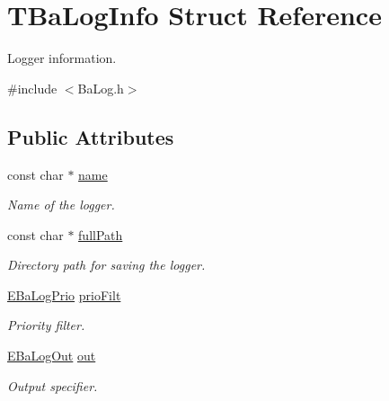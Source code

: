 \hypertarget{structTBaLogInfo}{}\section{T\+Ba\+Log\+Info Struct Reference}
\label{structTBaLogInfo}


Logger information.  




{\ttfamily \#include $<$Ba\+Log.\+h$>$}

\subsection*{Public Attributes}
\begin{DoxyCompactItemize}
\item 
\mbox{\label{structTBaLogInfo_a6fe0471fbe5aee2253366cd72f3fcfd2}} 
const char $\ast$ \hyperlink{structTBaLogInfo_a6fe0471fbe5aee2253366cd72f3fcfd2}{name}
\begin{DoxyCompactList}\small\item\em Name of the logger. \end{DoxyCompactList}\item 
\mbox{\label{structTBaLogInfo_aad77a8e412b731cb1f746fc2eec116a3}} 
const char $\ast$ \hyperlink{structTBaLogInfo_aad77a8e412b731cb1f746fc2eec116a3}{full\+Path}
\begin{DoxyCompactList}\small\item\em Directory path for saving the logger. \end{DoxyCompactList}\item 
\mbox{\label{structTBaLogInfo_a756157c50cdaf559e7e4705a9644d926}} 
\hyperlink{BaLog_8h_ab14f00a81932b8b62d2e8c4a2d7e3916}{E\+Ba\+Log\+Prio} \hyperlink{structTBaLogInfo_a756157c50cdaf559e7e4705a9644d926}{prio\+Filt}
\begin{DoxyCompactList}\small\item\em Priority filter. \end{DoxyCompactList}\item 
\mbox{\label{structTBaLogInfo_af72f79042561752b9a55b2429374d6e6}} 
\hyperlink{BaLog_8h_a1f5f5789212a206b457c4446abaf81c4}{E\+Ba\+Log\+Out} \hyperlink{structTBaLogInfo_af72f79042561752b9a55b2429374d6e6}{out}
\begin{DoxyCompactList}\small\item\em Output specifier. \end{DoxyCompactList}\item 

\end{DoxyCompactItemize}
